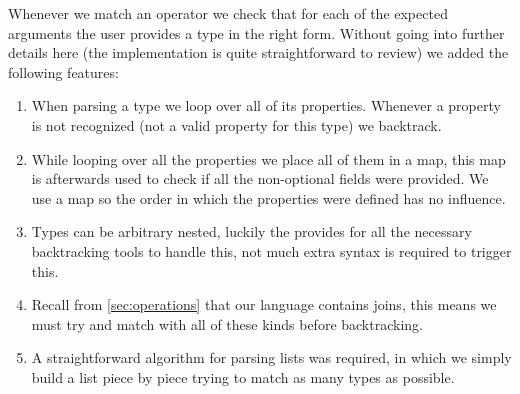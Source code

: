 \par
Whenever we match an operator we check that for each of the expected arguments
the user provides a type in the right form. Without going into further details
here (the implementation is quite straightforward to review) we added the
following features:

\begin{enumerate}
  \item When parsing a type we loop over all of its properties. Whenever a
  property is not recognized (not a valid property for this type) we backtrack.
  \item While looping over all the properties we place all of them in a map,
  this map is afterwards used to check if all the non-optional fields were
  provided. We use a map so the order in which the properties were defined has
  no influence.
  \item Types can be arbitrary nested, luckily the 
  provides for all the necessary backtracking tools to handle this, not much
  extra syntax is required to trigger this.
  \item Recall from \ref{sec:operations} that our language contains joins, this
  means we must try and match with all of these kinds before backtracking.
  \item A straightforward algorithm for parsing lists was required, in which we
  simply build a list piece by piece trying to match as many types as possible.
\end{enumerate}